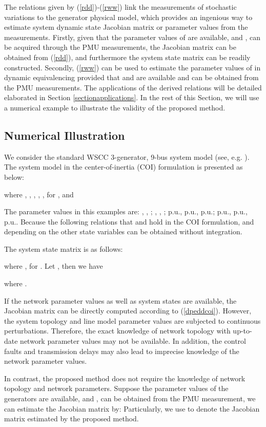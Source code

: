 \documentclass[journal]{IEEEtran}
\begin{document}
The relations given by (\ref{rdd})-(\ref{rww}) link the measurements of stochastic variations to the generator physical model, which provides an ingenious way to estimate system dynamic state Jacobian matrix or parameter values from the measurements. Firstly, given that the parameter values of  are available, and ,  can be acquired through the PMU measurements, the Jacobian matrix  can be obtained from (\ref{rdd}), and furthermore the system state matrix  can be readily constructed. Secondly, (\ref{rww}) can be used to estimate the parameter values of  in dynamic equivalencing provided that  and  are available and  can be obtained from the PMU measurements. The applications of the derived relations will be detailed elaborated in Section \ref{sectionapplications}. In the rest of this Section, we will use a numerical example to illustrate the validity of the proposed method.

\subsection{Numerical Illustration}

We consider the standard WSCC 3-generator, 9-bus system model (see, e.g. \cite{Chiang:book}). The system model in the center-of-inertia (COI) formulation is presented as below:

where , , , , , for ,
and

The parameter values in this examples are: , , ; , , ;  p.u.,  p.u.,  p.u.;  p.u.,  p.u.,  p.u..
Because the following relations that  and  hold in the COI formulation,  and  depending on the other state variables can be obtained without integration.

The system state matrix is as follows:

where , for . Let , then we have

where .

If the network parameter values as well as system states are available, the Jacobian matrix  can be directly computed according to (\ref{dpeddcoi}). However, the system topology and line model parameter values are subjected to continuous perturbations. Therefore, the exact knowledge of network topology with up-to-date network parameter values may not be available. In addition, the control faults and transmission delays may also lead to imprecise knowledge of the network parameter values.

In contrast, the proposed method does not require the knowledge of network topology and network parameters. Suppose the parameter values  of the generators are available, and ,  can be obtained from the PMU measurement, we can estimate the Jacobian matrix by: 
Particularly, we use  to denote the Jacobian matrix estimated by the proposed method.
\end{document}
